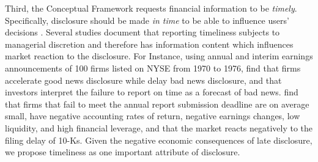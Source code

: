 \documentclass[letterpaper,11pt]{article}
\begin{document}
\begin{spacing}{1.5}
Third, the Conceptual Framework requests financial information to be \textit{timely}. Specifically, disclosure should be made \textit{in time} to be able to influence users' decisions \cite{fasbConceptualFrameworkFinancial2018}. Several studies document that reporting timeliness subjects to managerial discretion and therefore has information content which influences market reaction to the disclosure. For Instance, using annual and interim earnings announcements of 100 firms listed on NYSE from 1970 to 1976,  find that firms accelerate good news disclosure while delay bad news disclosure, and that investors interpret the failure to report on time as a forecast of bad news.  find that firms that fail to meet the annual report submission deadline are on average small, have negative accounting rates of return, negative earnings changes, low liquidity, and high financial leverage, and that the market reacts negatively to the filing delay of 10-Ks. Given the negative economic consequences of late disclosure, we propose timeliness as one important attribute of disclosure.


\end{spacing}
\end{document}
